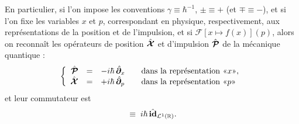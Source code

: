 En particulier, si l’on impose les conventions $\gamma \equiv \hbar^{-1}$, $\pm \equiv +$ (et $\mp \equiv -$), et si l’on fixe les variables \guillemotleft$x$\guillemotright{} et \guillemotleft$p$\guillemotright{}, correspondant en physique, respectivement, aux représentations de la position et de l’impulsion, et si $\mathcal F [ x \mapsto f(x) ](p)$, alors on reconnaît les opérateurs de position $\hat{\bm{\mathcal X}}$ et d’impulsion
$\hat{\bm{\mathcal P}}$ de la mécanique quantique :
\begin{eqnarray}
    \left\{
        \begin{array}{rclcl}
            \operator{\mathcal P} & = & - i \hbar\, \operator{\partial}_x & & \mbox{dans la représentation \guillemotleft$x$\guillemotright{}},\\
            \operator{\mathcal X} & = & + i \hbar\, \operator{\partial}_p & & \mbox{dans la représentation \guillemotleft$p$\guillemotright{}}
        \end{array}
    \right.
\end{eqnarray}
et leur commutateur est
\begin{eqnarray}
    [\operator{\mathcal{X}} ,  \operator{\mathcal{P}} ]\;\equiv\; i\hbar \, \operator{\mathrm{id}}_{\mathcal L^1 (\mathbb{R})}.
\end{eqnarray}



